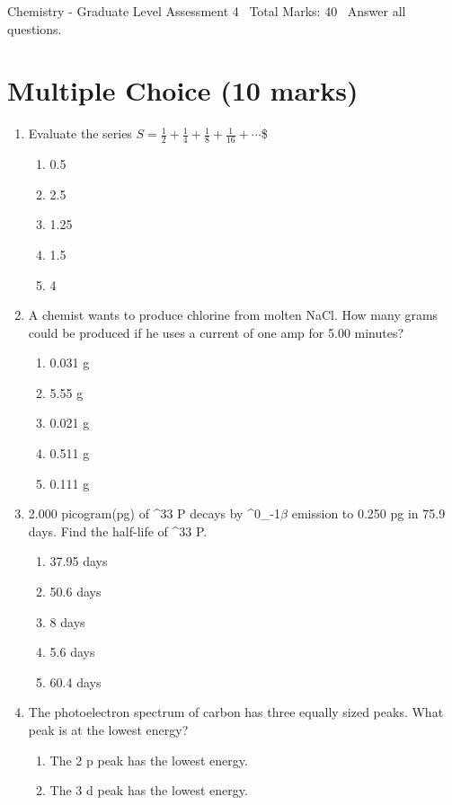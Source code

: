 \documentclass[12pt]{article}
\begin{document}
\begin{center}
Chemistry - Graduate Level Assessment 4 \
Total Marks: 40 \
Answer all questions.
\end{center}

\section*{Multiple Choice (10 marks)}
\begin{enumerate}[label=\arabic*.]
\item Evaluate the series $ S=\frac{1}{2}+\frac{1}{4}+\frac{1}{8}+\frac{1}{16}+\cdots $\$
\begin{enumerate}[label=(\alph*)]
    \item 0.5
    \item 2.5
    \item 1.25
    \item 1.5
    \item 4
\end{enumerate}
\item A chemist wants to produce chlorine from molten NaCl. How many grams could be produced if he uses a current of one amp for 5.00 minutes?
\begin{enumerate}[label=(\alph*)]
    \item 0.031 g
    \item 5.55 g
    \item 0.021 g
    \item 0.511 g
    \item 0.111 g
\end{enumerate}
\item 2.000 picogram(pg) of ^33 P decays by ^0\_-1\ensuremath{\beta} emission to 0.250 pg in 75.9 days. Find the half-life of ^33 P.
\begin{enumerate}[label=(\alph*)]
    \item 37.95 days
    \item 50.6 days
    \item 8 days
    \item 5.6 days
    \item 60.4 days
\end{enumerate}
\item The photoelectron spectrum of carbon has three equally sized peaks. What peak is at the lowest energy?
\begin{enumerate}[label=(\alph*)]
    \item The 2 p peak has the lowest energy.
    \item The 3 d peak has the lowest energy.

\end{enumerate}
\end{enumerate}
\end{document}
